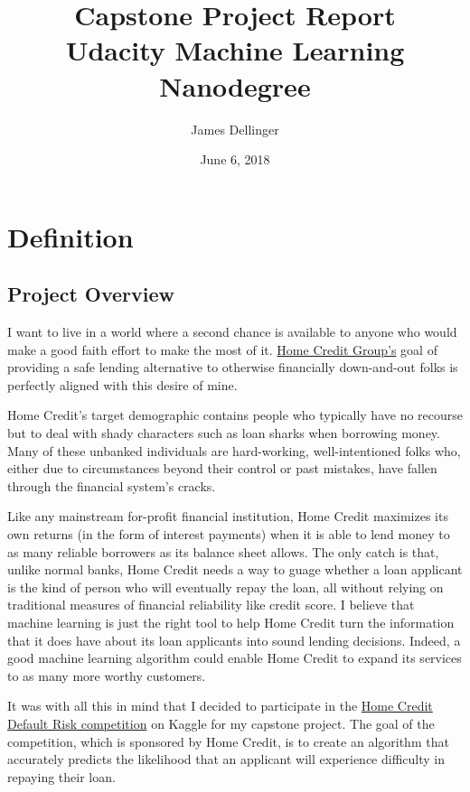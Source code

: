 \documentclass[12pt, letterpaper]{article}
\title{Capstone Project Report\\[8pt]
\normalsize{Udacity Machine Learning Nanodegree}}
\date{June 6, 2018}
\author{James Dellinger}
\begin{document}
\maketitle

\section{Definition}
\subsection{Project Overview}
I want to live in a world where a second chance is available to anyone who would make a good faith effort to make the most of it. \href{http://www.homecredit.net}{Home Credit Group’s}\cite{homecreditwebsite} goal of providing a safe lending alternative to otherwise financially down-and-out folks is perfectly aligned with this desire of mine.

Home Credit's target demographic contains people who typically have no recourse but to deal with shady characters such as loan sharks when borrowing money. Many of these unbanked individuals are hard-working, well-intentioned folks who, either due to circumstances beyond their control or past mistakes, have fallen through the financial system’s cracks.

Like any mainstream for-profit financial institution, Home Credit maximizes its own returns (in the form of interest payments) when it is able to lend money to as many reliable borrowers as its balance sheet allows. The only catch is that, unlike normal banks, Home Credit needs a way to guage whether a loan applicant is the kind of person who will eventually repay the loan, all without relying on traditional measures of financial reliability like credit score. I believe that machine learning is just the right tool to help Home Credit turn the information that it does have about its loan applicants into sound lending decisions. Indeed, a good machine learning algorithm could enable Home Credit to expand its services to as many more worthy customers.

It was with all this in mind that I decided to participate in the \href{https://www.kaggle.com/c/home-credit-default-risk}{Home Credit Default Risk competition} on Kaggle\cite{kagglehomecreditcompetitionoverview} for my capstone project. The goal of the competition, which is sponsored by Home Credit, is to create an algorithm that accurately predicts the likelihood that an applicant will experience difficulty in repaying their loan.
\end{document}
